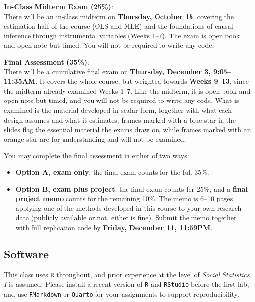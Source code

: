 \documentclass[12pt]{article}
\begin{document}
\noindent \textbf{\textcolor{titlecolor}{In-Class Midterm Exam (25\%)}}: \\
There will be an in-class midterm on \textbf{Thursday, October 15}, covering the estimation half of the course (OLS and MLE) and the foundations of causal inference through instrumental variables (Weeks 1--7). The exam is open book and open note but timed. You will not be required to write any code.

\vspace{0.5em}

\noindent \textbf{\textcolor{titlecolor}{Final Assessment (35\%)}}: \\
There will be a cumulative final exam on \textbf{Thursday, December 3, 9:05--11:35AM}. It covers the whole course, but weighted towards \textbf{Weeks 9--13}, since the midterm already examined Weeks 1--7. Like the midterm, it is open book and open note but timed, and you will not be required to write any code. What is examined is the material developed in scalar form, together with what each design assumes and what it estimates; frames marked with a \textcolor[RGB]{0,83,155}{blue star} in the slides flag the essential material the exams draw on, while frames marked with an \textcolor[RGB]{200,78,0}{orange star} are for understanding and will not be examined.

\vspace{0.4em}
\noindent You may complete the final assessment in either of two ways:
\begin{itemize}[noitemsep, topsep=2pt]
    \item \textbf{Option A, exam only}: the final exam counts for the full 35\%.
    \item \textbf{Option B, exam plus project}: the final exam counts for 25\%, and a \textbf{final project memo} counts for the remaining 10\%. The memo is 6--10 pages applying one of the methods developed in this course to your own research data (publicly available or not, either is fine). Submit the memo together with full replication code by \textbf{Friday, December 11, 11:59PM}.
\end{itemize}

\subsection*{Software}
This class uses \texttt{R} throughout, and prior experience at the level of \textit{Social Statistics I} is assumed. Please install a recent version of \texttt{R} and \texttt{RStudio} before the first lab, and use \texttt{RMarkdown} or \texttt{Quarto} for your assignments to support reproducibility.
\end{document}
